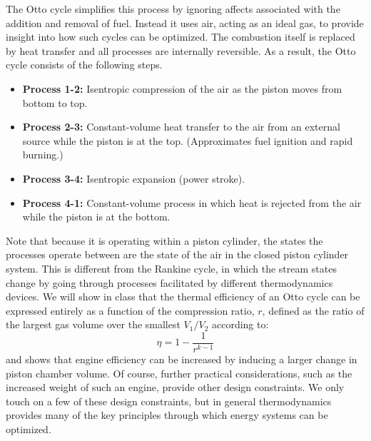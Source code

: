 The Otto cycle simplifies this process by ignoring affects associated with the addition and removal of fuel. Instead it uses air, acting as an ideal gas, to provide insight into how such cycles can be optimized. The combustion itself is replaced by heat transfer and all processes are internally reversible. As a result, the Otto cycle consists of the following steps.
\begin{itemize}
\item \textbf{Process 1-2:} Isentropic compression of the air as the piston moves from bottom to top.
\item \textbf{Process 2-3:} Constant-volume heat transfer to the air from an external source while the piston is at the top. (Approximates fuel ignition and rapid burning.)
\item \textbf{Process 3-4:} Isentropic expansion (power stroke).
\item \textbf{Process 4-1:} Constant-volume process in which heat is rejected from the air while the piston is at the bottom.
\end{itemize}
Note that because it is operating within a piston cylinder, the states the processes operate between are the state of the air in the closed piston cylinder system. This is different from the Rankine cycle, in which the stream states change by going through processes facilitated by different thermodynamics devices. We will show in class that the thermal efficiency of an Otto cycle can be expressed entirely as a function of the compression ratio, $r$, defined as the ratio of the largest gas volume over the smallest $V_1/V_2$ according to:
\begin{equation}
\eta = 1-\frac{1}{r^{k-1}}
\end{equation}
and shows that engine efficiency can be increased by inducing a larger change in piston chamber volume. Of course, further practical considerations, such as the increased weight of such an engine, provide other design constraints. We only touch on a few of these design constraints, but in general thermodynamics provides many of the key principles through which energy systems can be optimized. 

